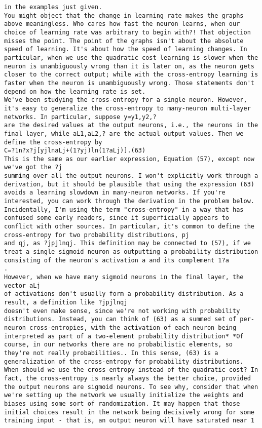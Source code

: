 \begin{lstlisting}
in the examples just given.
You might object that the change in learning rate makes the graphs above meaningless. Who cares how fast the neuron learns, when our choice of learning rate was arbitrary to begin with?! That objection misses the point. The point of the graphs isn't about the absolute speed of learning. It's about how the speed of learning changes. In particular, when we use the quadratic cost learning is slower when the neuron is unambiguously wrong than it is later on, as the neuron gets closer to the correct output; while with the cross-entropy learning is faster when the neuron is unambiguously wrong. Those statements don't depend on how the learning rate is set. 
We've been studying the cross-entropy for a single neuron. However, it's easy to generalize the cross-entropy to many-neuron multi-layer networks. In particular, suppose y=y1,y2,?
are the desired values at the output neurons, i.e., the neurons in the final layer, while aL1,aL2,? are the actual output values. Then we define the cross-entropy by 
C=?1n?x?j[yjlnaLj+(1?yj)ln(1?aLj)].(63)
This is the same as our earlier expression, Equation (57), except now we've got the ?j
summing over all the output neurons. I won't explicitly work through a derivation, but it should be plausible that using the expression (63) avoids a learning slowdown in many-neuron networks. If you're interested, you can work through the derivation in the problem below. 
Incidentally, I'm using the term "cross-entropy" in a way that has confused some early readers, since it superficially appears to conflict with other sources. In particular, it's common to define the cross-entropy for two probability distributions, pj
and qj, as ?jpjlnqj. This definition may be connected to (57), if we treat a single sigmoid neuron as outputting a probability distribution consisting of the neuron's activation a and its complement 1?a
.
However, when we have many sigmoid neurons in the final layer, the vector aLj
of activations don't usually form a probability distribution. As a result, a definition like ?jpjlnqj
doesn't even make sense, since we're not working with probability distributions. Instead, you can think of (63) as a summed set of per-neuron cross-entropies, with the activation of each neuron being interpreted as part of a two-element probability distribution* *Of course, in our networks there are no probabilistic elements, so they're not really probabilities.. In this sense, (63) is a generalization of the cross-entropy for probability distributions.
When should we use the cross-entropy instead of the quadratic cost? In fact, the cross-entropy is nearly always the better choice, provided the output neurons are sigmoid neurons. To see why, consider that when we're setting up the network we usually initialize the weights and biases using some sort of randomization. It may happen that those initial choices result in the network being decisively wrong for some training input - that is, an output neuron will have saturated near 1

\end{lstlisting}
